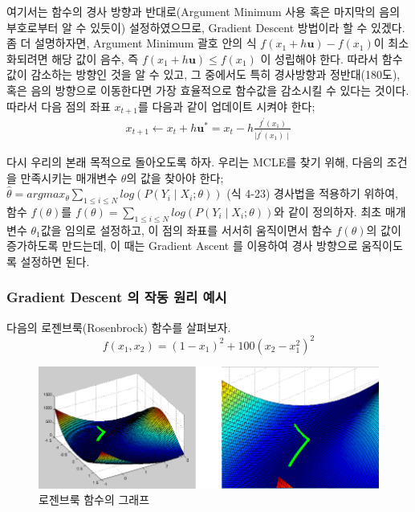 \documentclass[a4paper]{oblivoir}
\begin{document}
\indent 여기서는 함수의 경사 방향과 반대로(Argument Minimum 사용 혹은 마지막의 음의 부호로부터 알 수 있듯이) 설정하였으므로, Gradient Descent 방법이라 할 수 있겠다. 좀 더 설명하자면, Argument Minimum 괄호 안의 식 $f(x_{1}+h\textbf{u})-f(x_{1})$이 최소화되려면 해당 값이 음수, 즉 $f(x_{1}+h\textbf{u}) \leq f(x_{1})$ 이 성립해야 한다. 따라서 함수값이 감소하는 방향인 것을 알 수 있고, 그 중에서도 특히 경사방향과 정반대(180도), 혹은 음의 방향으로 이동한다면 가장 효율적으로 함수값을 감소시킬 수 있다는 것이다. \\
\indent 따라서 다음 점의 좌표 $x_{t+1}$를 다음과 같이 업데이트 시켜야 한다;
\begin{align*}
x_{t+1} \gets x_{t} + h\textbf{u}^{\ast} = x_{t} - h\frac{f^{\prime}(x_{1})}{\mid f^{\prime}(x_{1}) \mid} \tag{4-39}
\end{align*}

\indent 다시 우리의 본래 목적으로 돌아오도록 하자. 우리는 MCLE를 찾기 위해, 다음의 조건을 만족시키는 매개변수 $\theta$의 값을 찾아야 한다; \\
$\hat{\theta}=argmax_{\theta}\sum_{1\le i\le N}log(P(Y_{i} \mid X_{i};\theta))$ (식 4-23) 경사법을 적용하기 위하여, 함수 $f(\theta)$를 $f(\theta) = \sum_{1\leq i \leq N}log(P(Y_{i} \mid X_{i}; \theta))$와 같이 정의하자. 최초 매개변수 $\theta_{1}$값을 임의로 설정하고, 이 점의 좌표를 서서히 움직이면서 함수 $f(\theta)$의 값이 증가하도록 만드는데, 이 때는 Gradient Ascent 를 이용하여 경사 방향으로 움직이도록 설정하면 된다. 

\subsubsection{Gradient Descent 의 작동 원리 예시}
다음의 로젠브룩(Rosenbrock) 함수를 살펴보자. 
\begin{equation*} f(x_{1}, x_{2}) = (1 - x_{1})^{2} + 100(x_{2} - x_{1}^{2})^{2} \tag{4-40}\end{equation*}
\begin{figure}[ht]
\centering
\includegraphics[scale=0.8]{Rosenbrock_function.png}
\caption{로젠브룩 함수의 그래프}
\label{Figure 4-8}
\end{figure}
\end{document}
